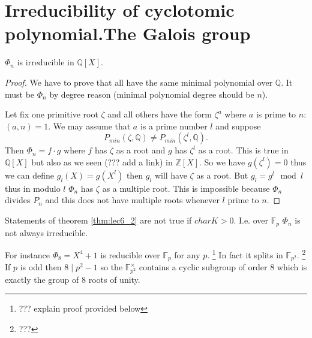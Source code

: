 \section{Irreducibility of cyclotomic polynomial.The Galois group}

\begin{theorem}
  $\Phi_n$ is irreducible in $\mathbb{Q}\left[X\right]$.
  \begin{proof}
    We have to prove that all  have
    the same minimal polynomial over $\mathbb{Q}$. It must be $\Phi_n$
    by degree reason (minimal polynomial degree should be $n$).

    Let fix one primitive root $\zeta$ and all others have the form
    $\zeta^a$ where $a$ is prime to $n$: $\left(a,n\right)=1$. We may
    assume that $a$ is a prime number $l$ and suppose
    \[
    P_{min}\left(\zeta, \mathbb{Q}\right)
    \ne
    P_{min}\left(\zeta^l, \mathbb{Q}\right).
    \]
    Then $\Phi_n = f \cdot g$ where $f$ has $\zeta$ as a root and $g$
    has $\zeta^l$ as a root. This is true in
    $\mathbb{Q}\left[X\right]$ but also as we seen (??? add a link) in
    $\mathbb{Z}\left[X\right]$. So we have $g\left(\zeta^l\right) = 0$
    thus we can define $g_l\left(X\right) = g\left(X^l\right)$ then
    $g_l$ will have $\zeta$ as a root. But $g_l = g^l \mod l$ thus in
    modulo $l$ $\Phi_n$ has $\zeta$ as a multiple root. This is
    impossible because $\Phi_n$ divides $P_n$ and this does not have
    multiple roots whenever $l$ prime to $n$. 
  \end{proof}
  \label{thm:lec6_2}
\end{theorem}

\begin{remark}
  Statements of theorem \ref{thm:lec6_2} are not true if $char K >
  0$. I.e. over $\mathbb{F}_p$ $\Phi_n$ is not always irreducible.

  For instance $\Phi_8 = X^4 + 1$ is reducible over $\mathbb{F}_p$ for
  any $p$.
  \footnote{
    ??? explain proof provided below
  }
  In fact it splits in $\mathbb{F}_{p^2}$.
  \footnote{
    ???
  }
  If $p$ is odd then $8\mid p^2-1$ so the 
  $\mathbb{F}_{p^2}^\times$ contains a cyclic subgroup of order 8 which is
  exactly the group of 8 roots of unity.
\end{remark}

